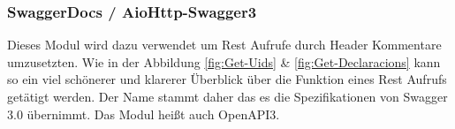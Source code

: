 \subsubsection{SwaggerDocs / AioHttp-Swagger3}\label{ssec:SwaggerDoc}
Dieses Modul wird dazu verwendet um Rest Aufrufe durch Header Kommentare umzusetzten. Wie in der Abbildung \ref{fig:Get-Uids} \& \ref{fig:Get-Declaracions} kann so ein viel schönerer und klarerer Überblick über die Funktion eines Rest Aufrufs getätigt werden. Der Name stammt daher das es die Spezifikationen von Swagger 3.0 übernimmt. Das Modul heißt auch OpenAPI3. 
